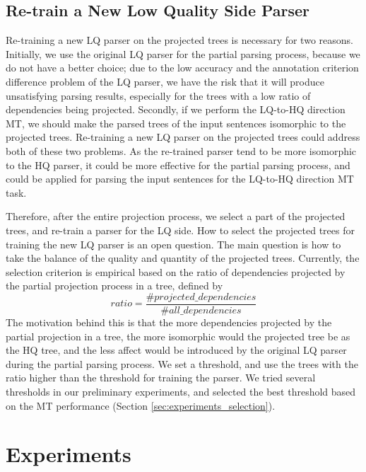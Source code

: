 \documentclass[english]{jnlp_1.4}
\begin{document}
\subsection{Re-train a New Low Quality Side Parser}
\label{sec:re-train}

Re-training a new LQ parser on the projected trees is necessary for two reasons. Initially, 
we use the original LQ parser for the partial parsing process, 
because we do not have a better choice;
due to the low accuracy and the annotation criterion difference problem of the LQ parser, we
\pagebreak
have the risk that it will produce unsatisfying parsing results, especially for the trees
with a low ratio of dependencies being projected. Secondly, if we perform the LQ-to-HQ 
direction MT, we should make the parsed trees of the input sentences isomorphic to the projected 
trees. Re-training a new LQ parser on the projected trees could address both of these two problems.
As the re-trained parser tend to be more isomorphic to the HQ parser, it could be more effective 
for the partial parsing process, and could be applied for parsing the input sentences for the 
LQ-to-HQ direction MT task. 

Therefore, after the entire projection process, we select a part of the projected trees,
and re-train a parser for the LQ side. How to select the projected trees for training the new
LQ parser is an open question. The main question is how to take the balance of the quality and quantity
of the projected trees. Currently, the selection criterion is empirical based on the ratio 
of dependencies projected by the partial projection process in a tree, defined by
\begin{equation}
ratio=\frac{\#projected\_dependencies}{\#all\_dependencies}
\end{equation}
The motivation behind this is that the more dependencies projected by the partial projection 
in a tree, the more isomorphic would the projected tree be as the HQ tree, and the less 
affect would be introduced by the original LQ parser during the partial parsing process.
We set a threshold, and use the trees with the ratio higher than the threshold for
training the parser. We tried several thresholds in our preliminary experiments, and selected the
best threshold
based on the MT performance {(Section \ref{sec:experiments_selection})}.


\section{Experiments}
\label{sec:experiments}
\end{document}
